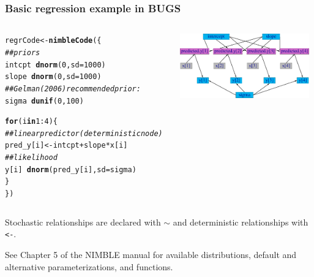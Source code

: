 \documentclass{beamer}\usepackage[]{graphicx}\usepackage[]{color}
\makeatletter
\newcommand{\hlnum}[1]{\textcolor[rgb]{0.686,0.059,0.569}{#1}}%
\newcommand{\hlcom}[1]{\textcolor[rgb]{0.678,0.584,0.686}{\textit{#1}}}%
\newcommand{\hlopt}[1]{\textcolor[rgb]{0,0,0}{#1}}%
\newcommand{\hlstd}[1]{\textcolor[rgb]{0.345,0.345,0.345}{#1}}%
\newcommand{\hlkwa}[1]{\textcolor[rgb]{0.161,0.373,0.58}{\textbf{#1}}}%
\newcommand{\hlkwb}[1]{\textcolor[rgb]{0.69,0.353,0.396}{#1}}%
\newcommand{\hlkwc}[1]{\textcolor[rgb]{0.333,0.667,0.333}{#1}}%
\newcommand{\hlkwd}[1]{\textcolor[rgb]{0.737,0.353,0.396}{\textbf{#1}}}%
\newenvironment{kframe}{%
 \def\at@end@of@kframe{}%
 \ifinner\ifhmode%
  \def\at@end@of@kframe{\end{minipage}}%
  \begin{minipage}{\columnwidth}%
 \fi\fi%
 \def\FrameCommand##1{\hskip\@totalleftmargin \hskip-\fboxsep
 \colorbox{shadecolor}{##1}\hskip-\fboxsep
     \hskip-\linewidth \hskip-\@totalleftmargin \hskip\columnwidth}%
 \MakeFramed {\advance\hsize-\width
   \@totalleftmargin\z@ \linewidth\hsize
   \@setminipage}}%
 {\par\unskip\endMakeFramed%
 \at@end@of@kframe}
\newenvironment{knitrout}{}{} %
\makeatother
\begin{document}
\begin{frame}[fragile] 
\sffamily
\frametitle{Basic regression example in BUGS}

\begin{columns}[T] %
\vspace{5mm}
\begin{column}{.48\textwidth}

\begin{knitrout}\tiny
{}\color{fgcolor}\begin{kframe}
\begin{alltt}
\hlstd{regrCode} \hlkwb{<-} \hlkwd{nimbleCode}\hlstd{(\{}
    \hlcom{## priors}
    \hlstd{intcpt} \hlopt{~} \hlkwd{dnorm}\hlstd{(}\hlnum{0}\hlstd{,} \hlkwc{sd} \hlstd{=} \hlnum{1000}\hlstd{)}
    \hlstd{slope} \hlopt{~} \hlkwd{dnorm}\hlstd{(}\hlnum{0}\hlstd{,} \hlkwc{sd} \hlstd{=} \hlnum{1000}\hlstd{)}
    \hlcom{## Gelman (2006) recommended prior:}
    \hlstd{sigma} \hlopt{~} \hlkwd{dunif}\hlstd{(}\hlnum{0}\hlstd{,} \hlnum{100}\hlstd{)}

    \hlkwa{for}\hlstd{(i} \hlkwa{in} \hlnum{1}\hlopt{:}\hlnum{4}\hlstd{) \{}
        \hlcom{## linear predictor (deterministic node)}
        \hlstd{pred_y[i]} \hlkwb{<-} \hlstd{intcpt} \hlopt{+} \hlstd{slope} \hlopt{*} \hlstd{x[i]}
        \hlcom{## likelihood }
        \hlstd{y[i]} \hlopt{~} \hlkwd{dnorm}\hlstd{(pred_y[i],} \hlkwc{sd} \hlstd{= sigma)}
    \hlstd{\}}
\hlstd{\})}
\end{alltt}
\end{kframe}
\end{knitrout}

\end{column}%

\begin{column}{.48\textwidth}
\includegraphics[width=2.2in]{plots/linearRegressionGraph-crop.pdf}
\end{column}%
\end{columns}

Stochastic relationships are declared with $\sim$
and deterministic relationships with \texttt{<-}.

See Chapter 5 of the NIMBLE manual for available distributions, default and alternative parameterizations, and functions.


\end{frame}
\end{document}
